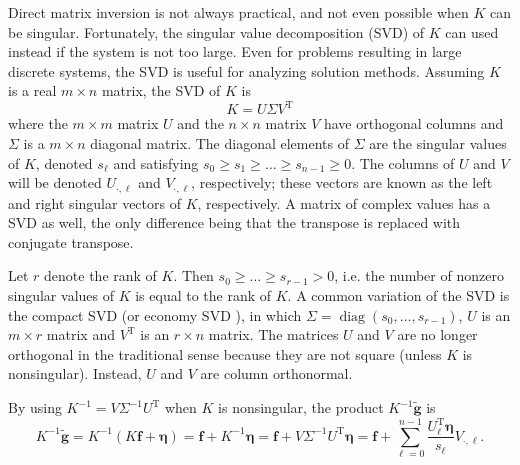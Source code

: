 \documentclass[12pt,notitlepage]{report}
\newcommand{\gnoiseVec}{\widetilde{\mathbf{g}}}	%
\newcommand{\kMat}{K}	%
\newcommand{\fVec}{\mathbf{f}}	%
\newcommand{\trans}{\mathrm{T}}	%
\DeclareMathOperator{\diag}{diag}	%
\newcommand{\noise}{\eta}	%
\newcommand{\noiseVec}{\bm{\noise}}	%
\newcommand{\singular}{s}	%
\begin{document}
Direct matrix inversion is not always practical, and not even possible when $\kMat$ can be singular. Fortunately, the singular value decomposition (SVD) of $\kMat$ can used instead if the system is not too large. Even for problems resulting in large discrete systems, the SVD is useful for analyzing solution methods.  Assuming $\kMat$ is a real $m \times n$ matrix, the SVD of $\kMat$ is
\begin{equation}
\kMat = U\Sigma{V^\trans}
\label{eq:SVD}
\end{equation}
where the $m \times m$ matrix $U$ and the $n \times n$ matrix $V$ have orthogonal columns and $\Sigma$ is a $m \times n$ diagonal matrix. The diagonal elements of $\Sigma$ are the singular values of $\kMat$, denoted $\singular_\ell$ and satisfying $\singular_0 \geq \singular_1 \geq \ldots \geq \singular_{n-1} \geq 0$. The columns of $U$ and $V$ will be denoted $U_{\cdot,\ell}$ and $V_{\cdot,\ell}$, respectively; these vectors are known as the left and right singular vectors of $\kMat$, respectively. A matrix of complex values has a SVD as well, the only difference being that the transpose is replaced with conjugate transpose. \par
Let $r$ denote the rank of $\kMat$. Then $\singular_0 \geq \ldots \geq \singular_{r-1} > 0$, i.e. the number of nonzero singular values of $\kMat$ is equal to the rank of $\kMat$.  A common variation of the SVD is the compact SVD (or economy SVD \cite{golub2013matrix}), in which $\Sigma = \diag(\singular_0,\ldots,\singular_{r-1})$, $U$ is an $m \times r$ matrix and $V^\trans$ is an $r \times n$ matrix. The matrices $U$ and $V$ are no longer orthogonal in the traditional sense because they are not square (unless $\kMat$ is nonsingular). Instead, $U$ and $V$ are column orthonormal. \par 
By using $\kMat^{-1} = V\Sigma^{-1}U^\trans$ when $\kMat$ is nonsingular, the product $\kMat^{-1}\gnoiseVec$ is
\begin{equation}
\kMat^{-1}\gnoiseVec = \kMat^{-1}\left(\kMat\fVec + \noiseVec\right) = \fVec + \kMat^{-1}\noiseVec = \fVec + V\Sigma^{-1}{U^\trans}\noiseVec = \fVec + \sum_{\ell = 0}^{n-1} \frac{{U^\trans_\ell}\noiseVec}{\singular_\ell}V_{\cdot,\ell}. 
\label{eq:InvProd}
\end{equation}
\end{document}

